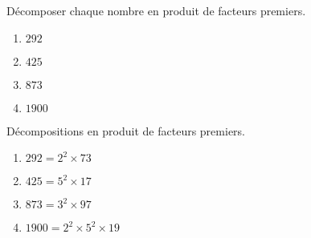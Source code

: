 \begin{exercice*}
    \label{N2exosBase014}
    Décomposer chaque nombre en produit de facteurs premiers.
    \begin{enumerate}
        \item $292$
        \item $425$
        \item $873$
        \item $\num{1900}$
    \end{enumerate}

\end{exercice*}
\begin{corrige}
    Décompositions en produit de facteurs premiers.
    \begin{enumerate}
        \item $292=2^2\times 73$
        \item $425=5^2\times 17$
        \item $873=3^2\times 97$
        \item $\num{1900}=2^2\times 5^2 \times 19$
    \end{enumerate}

\end{corrige}

